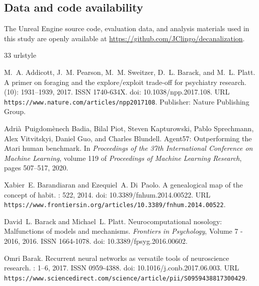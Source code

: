 \documentclass[12pt,fleqn]{article}
\begin{document}
\subsection*{Data and code availability}
The Unreal Engine source code, evaluation data, and analysis materials used in this study are openly available at \url{https://github.com/JClingo/decanalization}.

\sloppy
\begin{thebibliography}{33}
  \providecommand{\natexlab}[1]{#1}
  \providecommand{\url}[1]{\texttt{#1}}
  \expandafter\ifx\csname urlstyle\endcsname\relax
    \providecommand{\doi}[1]{doi: #1}\else
    \providecommand{\doi}{doi: \begingroup \urlstyle{rm}\Url}\fi

  M.~A. Addicott, J.~M. Pearson, M.~M. Sweitzer, D.~L. Barack, and M.~L. Platt.
  \newblock A primer on foraging and the explore/exploit trade-off for psychiatry
  research.
   (10): 1931--1939, 2017.
  \newblock ISSN 1740-634X.
  \newblock \doi{10.1038/npp.2017.108}.
  \newblock URL \url{https://www.nature.com/articles/npp2017108}.
  \newblock Publisher: Nature Publishing Group.

  Adri\`a~Puigdom\`enech Badia, Bilal Piot, Steven Kapturowski, Pablo
  Sprechmann, Alex Vitvitskyi, Daniel Guo, and Charles Blundell.
  \newblock Agent57: Outperforming the {Atari} human benchmark.
  \newblock In \emph{Proceedings of the 37th International Conference on
  Machine Learning}, volume 119 of \emph{Proceedings of Machine Learning
  Research}, pages 507--517, 2020.

  Xabier~E. Barandiaran and Ezequiel~A. Di~Paolo.
  \newblock A genealogical map of the concept of habit.
  : 522, 2014.
  \newblock \doi{10.3389/fnhum.2014.00522}.
  \newblock URL
  \url{https://www.frontiersin.org/articles/10.3389/fnhum.2014.00522}.

  David~L. Barack and Michael~L. Platt.
  \newblock Neurocomputational nosology: {{Malfunctions}} of models and
  mechanisms.
  \newblock \emph{Frontiers in Psychology}, Volume 7 - 2016, 2016.
  \newblock ISSN 1664-1078.
  \newblock \doi{10.3389/fpsyg.2016.00602}.

  Omri Barak.
  \newblock Recurrent neural networks as versatile tools of neuroscience
  research.
  : 1--6, 2017.
  \newblock ISSN 0959-4388.
  \newblock \doi{10.1016/j.conb.2017.06.003}.
  \newblock URL
  \url{https://www.sciencedirect.com/science/article/pii/S0959438817300429}.


\end{thebibliography}
\end{document}
